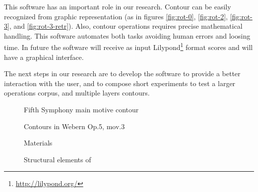 This software has an important role in our research. Contour can be
easily recognized from graphic representation (as in figures
\ref{fig:rot-0}, \ref{fig:rot-2}, \ref{fig:rot-3}, and
\ref{fig:rot-3-retr}). Also, contour operations requires precise
mathematical handling. This software automates both tasks avoiding
human errors and loosing time. In future the software will receive as
input Lilypond\footnote{\url{http://lilypond.org/}} format scores and
will have a graphical interface.

The next steps in our research are to develop the software to provide
a better interaction with the user, and to compose short experiments
to test a larger operations corpus, and multiple layers contours.

\break

\begin{figure}[!p]
  \centering
  \subfloat[Contour (3 1 2 0)]{
    \texttt{[image: c-3120]}
    \label{fig:c-3120}
  }
  \caption{Fifth Symphony main motive contour}
  \label{fig:5a-sinfonia}
\end{figure}

\begin{figure}[!p]
  \centering

  \quad
  \caption{Contours in Webern Op.5, mov.3}
  \label{fig:exemplos-webern}
\end{figure}

\begin{figure}[!p]
  \centering
  \subfloat[P(5 3 4 1 2 0) contour]{
    \texttt{[image: c-534120]}
    \label{fig:c-534120}
  }
  \caption{Materials}
  \label{fig:materials}
\end{figure}

\begin{figure}
  \centering

  \caption{Structural elements of }
  \label{fig:elementos-fugato}
\end{figure}


